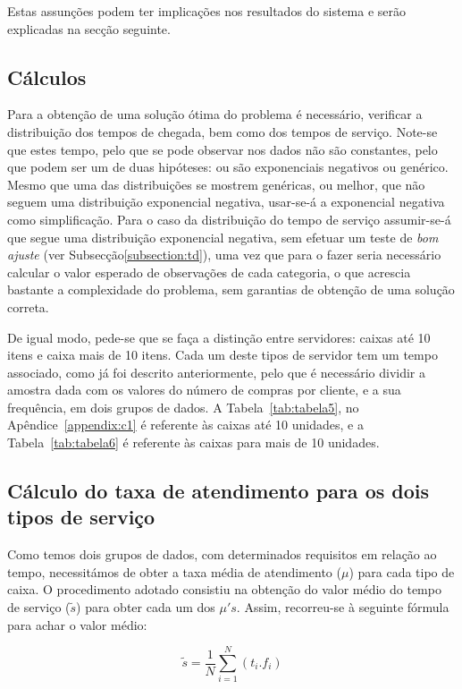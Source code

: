 Estas assunções podem ter implicações nos resultados do sistema e serão
explicadas na secção seguinte.\


\subsection{Cálculos}

Para a obtenção de uma solução ótima do problema é necessário, verificar
a distribuição dos tempos de chegada, bem como dos tempos de serviço.  Note-se
que estes tempo, pelo que se pode observar nos dados não são constantes, pelo
que podem ser um de duas hipóteses: ou são exponenciais negativos ou genérico.
Mesmo que uma das distribuições se mostrem genéricas, ou melhor, que não seguem
uma distribuição exponencial negativa, usar-se-á a exponencial negativa como
simplificação. Para o caso da distribuição do tempo de serviço assumir-se-á que
segue uma distribuição exponencial negativa, sem efetuar um teste de \emph{bom
ajuste} (ver Subsecção\ref{subsection:td}), uma vez que para o fazer seria
necessário calcular o valor esperado de observações de cada categoria, o que
acrescia bastante a complexidade do problema, sem garantias de obtenção de uma
solução correta.

De igual modo, pede-se que se faça a distinção entre servidores: caixas até 10
itens e caixa mais de 10 itens. Cada um deste tipos de servidor tem um tempo
associado, como já foi descrito anteriormente, pelo que é necessário dividir
a amostra dada com os valores do número de compras por cliente, e a sua
frequência, em dois grupos de dados. A Tabela~\ref{tab:tabela5}, no
Apêndice~\ref{appendix:c1} é referente às caixas até 10 unidades,
e a Tabela~\ref{tab:tabela6} é referente às caixas para mais de 10 unidades.





\subsection{Cálculo do taxa de atendimento para os dois tipos de serviço}

Como temos dois grupos de dados, com determinados requisitos em relação ao
tempo, necessitámos de obter a taxa média de atendimento ($\mu$) para cada tipo
de caixa. O procedimento adotado consistiu na obtenção do valor médio do tempo
de serviço ($\tilde{s}$) para obter cada um dos $\mu's$. Assim, recorreu-se
à seguinte fórmula para achar o valor médio:

\begin{equation}
	\tilde{s}=\dfrac{1}{N}\sum^{N}_{i=1} (t_i.f_i)
	\label{eq:equation1}
\end{equation}

